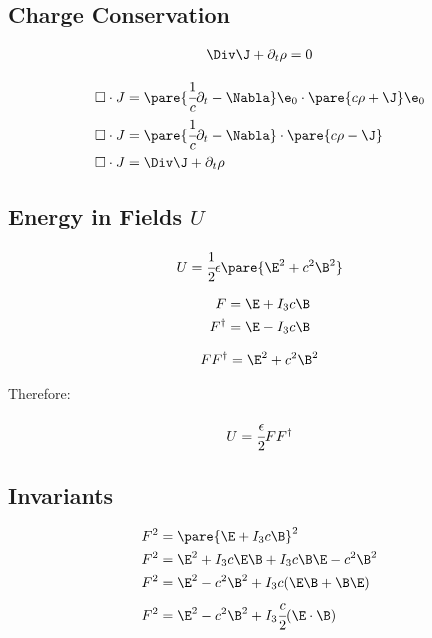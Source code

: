 \subsection{Charge Conservation}

  \begin{align}
    \Div \J + \partial_t{\rho} = 0
  \end{align}

  \begin{align}
    \square \cdot J &= \pare{\cfrac{1}{c}\partial_t - \Nabla}\e_0\cdot\pare{c\rho + \J}\e_0 \\
    \square \cdot J &= \pare{\cfrac{1}{c}\partial_t - \Nabla}\cdot\pare{c\rho - \J}\ \\
    \square\cdot J&= \Div \J + \partial_t \rho
  \end{align}

\subsection{Energy in Fields $U$}

  \begin{align}
    U = \cfrac{1}{2}\epsilon\pare{\E^2 + c^2\B^2}
  \end{align}


  \begin{align}
    F &= \E + I_3c\B \\
    F^\dagger &= \E - I_3c\B
  \end{align}

  \begin{align}
    FF^\dagger = \E^2 + c^2\B^2
  \end{align}

  Therefore:

  \begin{align}
    U = \cfrac{\epsilon}{2}FF^\dagger
  \end{align}

\subsection{Invariants}

  \begin{align}
    F^2 &= \pare{\E + I_3c\B}^2 \\
    F^2 &= \E^2 + I_3c\E\B + I_3c\B\E -c^2\B^2 \\
    F^2 &= \E^2 - c^2\B^2 + I_3c(\E\B + \B\E)  \\
    F^2 &= \E^2 - c^2\B^2 + I_3 \cfrac{c}{2} (\E \cdot \B)
  \end{align}

